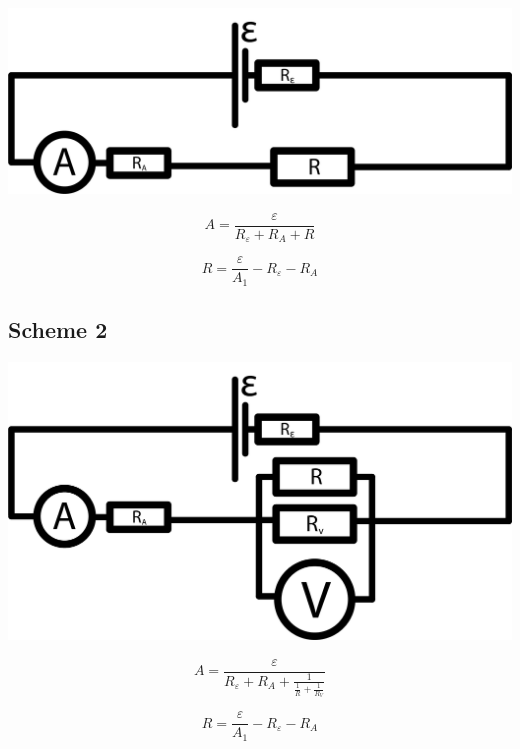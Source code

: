 \documentclass[11pt]{memoir}
\begin{document}
            \includegraphics[width=\linewidth]{../schemes/Scheme1.png}

            \begin{equation*}
                A = \frac{\varepsilon}{R_\varepsilon + R_A + R}
            \end{equation*}

            \begin{equation}\label{eq:equation1}
                R = \frac{\varepsilon}{A_1} - R_\varepsilon - R_A
            \end{equation}

    \newpage

    \subsection{Scheme 2}\label{subsec:scheme-2}

    \includegraphics[width=\linewidth]{../schemes/Scheme2.png}

    \begin{equation*}
        A = \frac{\varepsilon}{R_\varepsilon + R_A + \frac{1}{\frac{1}{R} + \frac{1}{R_V}}}
    \end{equation*}

    \begin{equation}\label{eq:equation2}
    R = \frac{\varepsilon}{A_1} - R_\varepsilon - R_A
    \end{equation}
\end{document}
